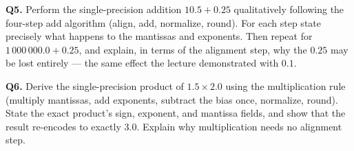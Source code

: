 \documentclass[11pt]{article}
\begin{document}
\textbf{Q5.} Perform the single-precision addition $10.5 + 0.25$ qualitatively following the four-step add algorithm (align, add, normalize, round). For each step state precisely what happens to the mantissas and exponents. Then repeat for $1\,000\,000.0 + 0.25$, and explain, in terms of the alignment step, why the $0.25$ may be lost entirely --- the same effect the lecture demonstrated with $0.1$.

\textbf{Q6.} Derive the single-precision product of $1.5 \times 2.0$ using the multiplication rule (multiply mantissas, add exponents, subtract the bias once, normalize, round). State the exact product's sign, exponent, and mantissa fields, and show that the result re-encodes to exactly $3.0$. Explain why multiplication needs no alignment step.
\end{document}
